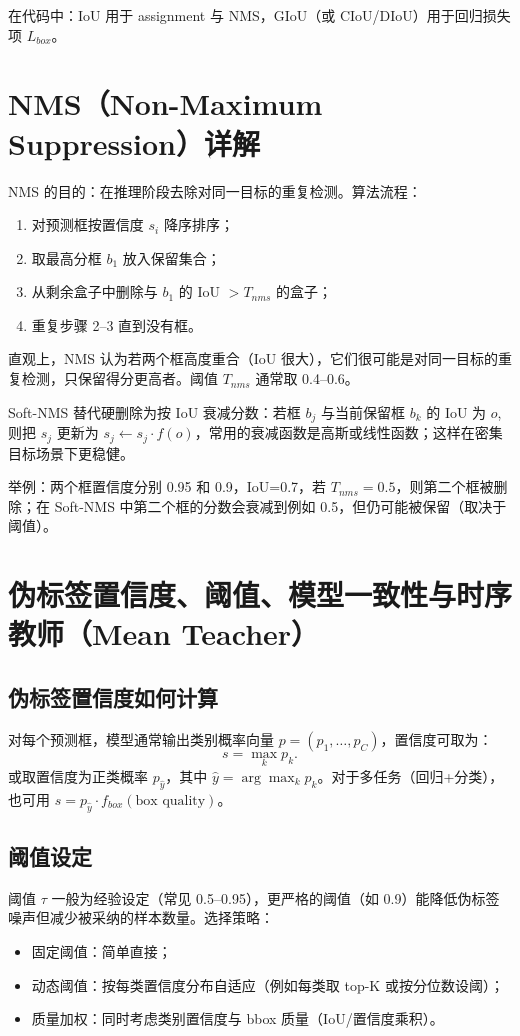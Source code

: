 \documentclass[11pt,a4paper]{article}
\begin{document}
在代码中：IoU 用于 assignment 与 NMS，GIoU（或 CIoU/DIoU）用于回归损失项 $L_{box}$。

\section{NMS（Non-Maximum Suppression）详解}
NMS 的目的：在推理阶段去除对同一目标的重复检测。算法流程：
\begin{enumerate}
  \item 对预测框按置信度 $s_i$ 降序排序；
  \item 取最高分框 $b_1$ 放入保留集合；
  \item 从剩余盒子中删除与 $b_1$ 的 IoU $> T_{nms}$ 的盒子；
  \item 重复步骤 2--3 直到没有框。
\end{enumerate}

直观上，NMS 认为若两个框高度重合（IoU 很大），它们很可能是对同一目标的重复检测，只保留得分更高者。阈值 $T_{nms}$ 通常取 0.4--0.6。\par

Soft-NMS 替代硬删除为按 IoU 衰减分数：若框 $b_j$ 与当前保留框 $b_k$ 的 IoU 为 $o$, 则把 $s_j$ 更新为 $s_j \leftarrow s_j \cdot f(o)$，常用的衰减函数是高斯或线性函数；这样在密集目标场景下更稳健。

举例：两个框置信度分别 0.95 和 0.9，IoU=0.7，若 $T_{nms}=0.5$，则第二个框被删除；在 Soft-NMS 中第二个框的分数会衰减到例如 0.5，但仍可能被保留（取决于阈值）。

\section{伪标签置信度、阈值、模型一致性与时序教师（Mean Teacher）}
\subsection*{伪标签置信度如何计算}
对每个预测框，模型通常输出类别概率向量 $p=(p_1,\dots,p_C)$，置信度可取为：
\[
s=\max_k p_k.
\]
或取置信度为正类概率 $p_{\hat y}$，其中 $\hat y=\arg\max_k p_k$。对于多任务（回归+分类），也可用 $s= p_{\hat y}\cdot f_{box}(\text{box quality})$。

\subsection*{阈值设定}
阈值 $\tau$ 一般为经验设定（常见 0.5--0.95），更严格的阈值（如 0.9）能降低伪标签噪声但减少被采纳的样本数量。选择策略：
\begin{itemize}
  \item 固定阈值：简单直接；
  \item 动态阈值：按每类置信度分布自适应（例如每类取 top-K 或按分位数设阈）；
  \item 质量加权：同时考虑类别置信度与 bbox 质量（IoU/置信度乘积）。
\end{itemize}
\end{document}
